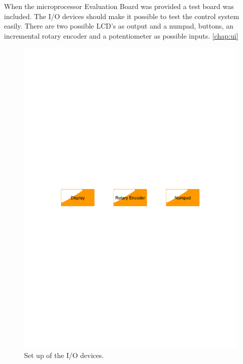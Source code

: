When the microprocessor Evaluation Board was provided a test board was included. The I/O devices should make it possible to test the control system easily. There are two possible LCD's as output and a numpad, buttons, an incremental rotary encoder and a potentiometer as possible inputs. \ref{chap:ui}
\begin{figure}[htb]
	\centering
	\includegraphics[scale=0.6,clip,trim=00 400 00 400]{graphics/iodevices} %
	\caption{Set up of the I/O devices.}
	\label{fig:iodevices}			%
\end{figure}


